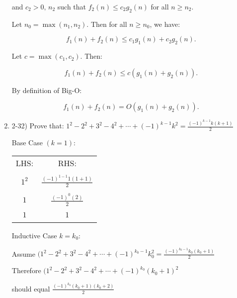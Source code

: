 \documentclass{article}
\begin{document}
\begin{enumerate}
and $c_2 > 0,\, n_2 $ such that $ f_2(n) \leq c_2 g_2(n) $ for all $ n \geq n_2.$


Let $ n_0 = \max(n_1, n_2) $. Then for all $ n \geq n_0 $, we have:

\[
f_1(n) + f_2(n) \leq c_1 g_1(n) + c_2 g_2(n).
\]

Let $ c = \max(c_1, c_2) $. Then:

\[
f_1(n) + f_2(n) \leq c(g_1(n) + g_2(n)).
\]

By definition of Big-O:

\[
f_1(n) + f_2(n) = O(g_1(n) + g_2(n)).
\]

    \item 2-32) Prove that: 
    \(1^2-2^2+3^2-4^2+\cdots+(-1)^{k-1}k^2=\frac{(-1)^{k-1}k(k+1)}{2}\)

    Base Case $(k=1)$:
    \begin{center}
        \begin{tabular}{ c | c } 
        LHS: & RHS: \\ & \\
        $ 1^2 $ & $ \frac{(-1)^{1-1}1(1+1)}{2} $ \\ \\
        $ 1 $ & $ \frac{(-1)^{0}(2)}{2} $ \\ \\
        $ 1 $ & $ 1 $ \\ \\
        \end{tabular}
    \end{center}
    Inductive Case $ k = k_0 $:
    
        Assume $ (1^2-2^2+3^2-4^2+\cdots+(-1)^{k_0-1}k_0^2 = \frac{(-1)^{k_0-1}k_0(k_0+1)}{2} $

        Therefore $ (1^2-2^2+3^2-4^2+\cdots+(-1)^{k_0}(k_0+1)^2 $ 
        
        should equal $ \frac{(-1)^{k_0}(k_0+1)(k_0+2)}{2} $


\end{enumerate}
\end{document}
